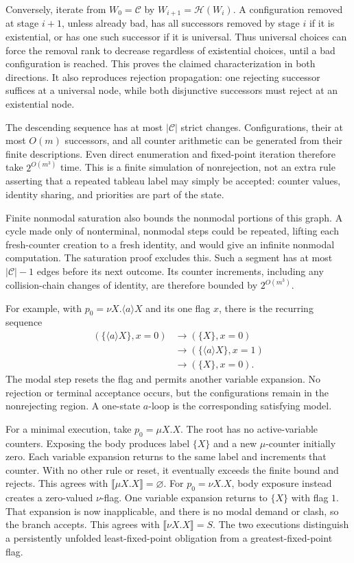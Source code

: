 Conversely, iterate from \(W_0=\mathcal C\) by
\(W_{i+1}=\mathcal H(W_i)\). A configuration
removed at stage \(i+1\), unless already bad,
has all successors removed by stage \(i\) if
it is existential, or has one such successor
if it is universal. Thus universal choices
can force the removal rank to decrease
regardless of existential choices, until a
bad configuration is reached. This proves
the claimed characterization in both directions.
It also reproduces rejection propagation:
one rejecting successor suffices at a universal
node, while both disjunctive successors must
reject at an existential node.

The descending sequence has at most
\(|\mathcal C|\) strict changes. Configurations,
their at most \(O(m)\) successors, and all
counter arithmetic can be generated from their
finite descriptions. Even direct enumeration
and fixed-point iteration therefore take
\(2^{O(m^3)}\) time. This is a finite
simulation of nonrejection, not an extra rule
asserting that a repeated tableau label may
simply be accepted: counter values, identity
sharing, and priorities are part of the state.

Finite nonmodal saturation also bounds the
nonmodal portions of this graph. A cycle made
only of nonterminal, nonmodal steps could be
repeated, lifting each fresh-counter creation
to a fresh identity, and would give an infinite
nonmodal computation. The saturation proof
excludes this. Such a segment has at most
\(|\mathcal C|-1\) edges before its next
outcome. Its counter increments, including
any collision-chain changes of identity,
are therefore bounded by \(2^{O(m^3)}\).

For example, with \(p_0=\nu X.\langle a\rangle X\)
and its one flag \(x\), there is the recurring
sequence
\[
\begin{aligned}
 (\{\langle a\rangle X\},x=0)
   &\longrightarrow(\{X\},x=0)\\
   &\longrightarrow(\{\langle a\rangle X\},x=1)\\
   &\longrightarrow(\{X\},x=0).
\end{aligned}
\]
The modal step resets the flag and permits another
variable expansion. No rejection or terminal
acceptance occurs, but the configurations remain
in the nonrejecting region. A one-state
\(a\)-loop is the corresponding satisfying model.

For a minimal execution, take \(p_0=\mu X.X\).
The root has no active-variable counters. Exposing the
body produces label \(\{X\}\) and a new \(\mu\)-counter
initially zero. Each variable expansion returns to
the same label and increments that counter. With no
other rule or reset, it eventually exceeds the finite
bound and rejects. This agrees with
\(\llbracket\mu X.X\rrbracket=\varnothing\).
For \(p_0=\nu X.X\), body exposure instead creates
a zero-valued \(\nu\)-flag. One variable expansion
returns to \(\{X\}\) with flag \(1\). That expansion
is now inapplicable, and there is no modal demand
or clash, so the branch accepts. This agrees with
\(\llbracket\nu X.X\rrbracket=S\). The two executions
distinguish a persistently unfolded least-fixed-point
obligation from a greatest-fixed-point flag.

